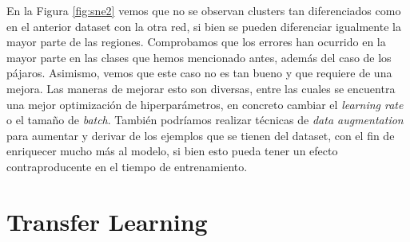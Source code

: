 \documentclass[12pt]{scrartcl}
\begin{document}
\begin{itemize}
En la Figura \ref{fig:sne2} vemos que no se observan clusters tan diferenciados como en el anterior dataset con la otra red, si bien se pueden diferenciar igualmente la mayor parte de las regiones. Comprobamos que los errores han ocurrido en la mayor parte en las clases que hemos mencionado antes, además del caso de los pájaros. Asimismo, vemos que este caso no es tan bueno y que requiere de una mejora. Las maneras de mejorar esto son diversas, entre las cuales se encuentra una mejor optimización de hiperparámetros, en concreto cambiar el \emph{learning rate} o el tamaño de \emph{batch}. También podríamos realizar técnicas de \emph{data augmentation} para aumentar y derivar de los ejemplos que se tienen del dataset, con el fin de enriquecer mucho más al modelo, si bien esto pueda tener un efecto contraproducente en el tiempo de entrenamiento.

\end{itemize}

\section{Transfer Learning}
\end{document}
